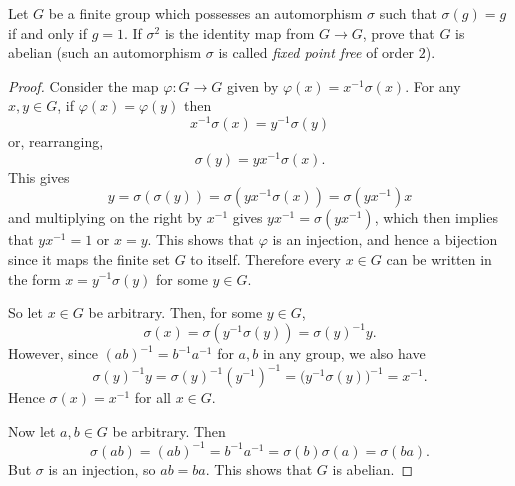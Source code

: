  Let $G$ be a finite group which possesses an
automorphism $\sigma$ such that $\sigma(g) = g$ if and only if
$g = 1$. If $\sigma^2$ is the identity map from $G\to G$, prove that
$G$ is abelian (such an automorphism $\sigma$ is called {\em fixed
  point free} of order $2$).
\begin{proof}
  Consider the map $\varphi\colon G\to G$ given by
  $\varphi(x) = x^{-1}\sigma(x)$. For any $x,y\in G$, if
  $\varphi(x) = \varphi(y)$ then
  \begin{equation*}
    x^{-1}\sigma(x) = y^{-1}\sigma(y)
  \end{equation*}
  or, rearranging,
  \begin{equation*}
    \sigma(y) = yx^{-1}\sigma(x).
  \end{equation*}
  This gives
  \begin{equation*}
    y = \sigma(\sigma(y)) = \sigma(yx^{-1}\sigma(x))
    = \sigma(yx^{-1})x
  \end{equation*}
  and multiplying on the right by $x^{-1}$ gives
  $yx^{-1} = \sigma(yx^{-1})$, which then implies that $yx^{-1} = 1$
  or $x = y$. This shows that $\varphi$ is an injection, and hence a
  bijection since it maps the finite set $G$ to itself. Therefore
  every $x\in G$ can be written in the form $x = y^{-1}\sigma(y)$ for
  some $y\in G$.

  So let $x\in G$ be arbitrary. Then, for some $y\in G$,
  \begin{equation*}
    \sigma(x) = \sigma(y^{-1}\sigma(y)) = \sigma(y)^{-1}y.
  \end{equation*}
  However, since $(ab)^{-1} = b^{-1}a^{-1}$ for $a,b$ in any group, we
  also have
  \begin{equation*}
    \sigma(y)^{-1}y = \sigma(y)^{-1}(y^{-1})^{-1}
    = \big(y^{-1}\sigma(y)\big)^{-1} = x^{-1}.
  \end{equation*}
  Hence $\sigma(x) = x^{-1}$ for all $x\in G$.

  Now let $a,b\in G$ be arbitrary. Then
  \begin{equation*}
    \sigma(ab) = (ab)^{-1} = b^{-1}a^{-1} = \sigma(b)\sigma(a) = \sigma(ba).
  \end{equation*}
  But $\sigma$ is an injection, so $ab = ba$. This shows that $G$ is
  abelian.
\end{proof}
